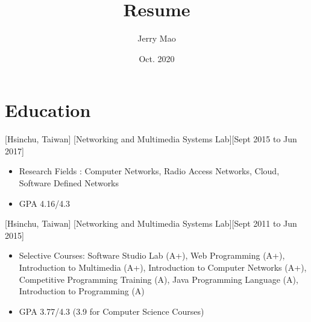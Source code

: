 \documentclass{article}
\title{Resume}
\author{Jerry Mao}
\date{Oct. 2020}
\begin{document}

\makecvtitle %

\section{Education}
[Hsinchu, Taiwan]
[Networking and Multimedia Systems Lab][Sept 2015 to Jun 2017]

\begin{itemize}
\item Research Fields : Computer Networks, Radio Access Networks, Cloud, Software Defined
Networks
\item GPA 4.16/4.3
\end{itemize}

[Hsinchu, Taiwan]
[Networking and Multimedia Systems Lab][Sept 2011 to Jun 2015]
\begin{itemize}
\item Selective Courses: Software Studio Lab (A+), Web Programming (A+), Introduction to Multimedia (A+), Introduction to Computer Networks (A+), Competitive Programming Training (A), Java Programming Language (A), Introduction to Programming (A)
\item GPA 3.77/4.3 (3.9 for Computer Science Courses)
\end{itemize}
\end{document}
